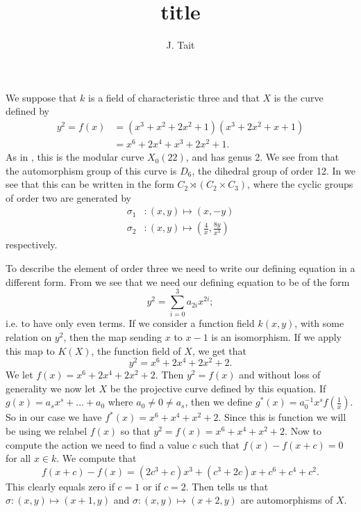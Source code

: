 \documentclass[draft, 11pt]{article} %
\title{title}
\author{J. Tait}
\theoremstyle{plain}
\theoremstyle{remark}
\begin{document}
\maketitle

We suppose that $k$ is a field of characteristic three and that $X$ is the curve defined by
\begin{align*}
y^2 = f(x)  & = (x^3 + x^2 + 2x^2 + 1)(x^3 + 2x^2 + x + 1)\\
& = x^6 + 2x^4 + x^3 + 2x^2 + 1.
\end{align*}
As in \cite[Table 2]{automorphismshyperellipticmodular}, this is the modular curve $X_0(22)$, and has genus 2.
We see from \cite[Table 1]{automorphismshyperellipticmodular} that the automorphism group of this curve is $D_6$, the dihedral group of order 12.
In \cite[\S 3.3]{automorphismshyperellipticmodular} we see that this can be written in the form $C_2 \rtimes (C_2 \times C_3)$, where the cyclic groups of order two are generated by
\begin{align*}
\sigma_1 & \colon (x,y) \mapsto (x,-y) \\
\sigma_2 & \colon (x,y) \mapsto \left( \frac{4}{x}, \frac{8y}{x^3} \right)
\end{align*}
respectively.

To describe the element of order three we need to write our defining equation in a different form.
From \cite[\S 3.3]{automorphismshyperellipticmodular} we see that we need our defining equation to be of the form 
\[
y^2 = \sum_{i=0}^3 a_{2i}x^{2i};
\]
i.e. to have only even terms.
If we consider a function field $k(x,y)$, with some relation on $y^2$, then the map sending $x$ to $x-1$ is an isomorphism.
If we apply this map to $K(X)$, the function field of $X$, we get that
\[
y^2 = x^6 + 2x^4 + 2x^2 + 2.
\]
We let $f(x) = x^6 + 2x^4 + 2x^2 + 2$.
Then $y^2 = f(x)$ and without loss of generality we now let $X$ be the projective curve defined by this equation.
If $g(x) = a_sx^s + \ldots + a_0$ where $a_0 \neq 0 \neq a_s$, then we define $g^*(x) = a_0^{-1}x^sf\left( \frac{1}{x} \right)$.
So in our case we have $f^*(x) = x^6  + x^4 + x^2 + 2$.
Since this is function we will be using we relabel $f(x)$ so that $y^2 = f(x) = x^6 + x^4 + x^2 + 2$.
Now to compute the action we need to find a value $c$ such that $f(x) - f(x+c) = 0$ for all $x \in k$.
We compute that
\[
f(x+c) - f(x) = (2c^3+c)x^3 + (c^3 + 2c)x + c^6 + c^4 + c^2.
\]
This clearly equals zero if $c=1$ or if $c=2$.
Then \cite[\S 3.3]{automorphismshyperellipticmodular} tells us that $\sigma \colon (x,y) \mapsto (x+1, y)$ and $\sigma \colon (x,y) \mapsto (x+2,y)$ are automorphisms of $X$.
\end{document}
